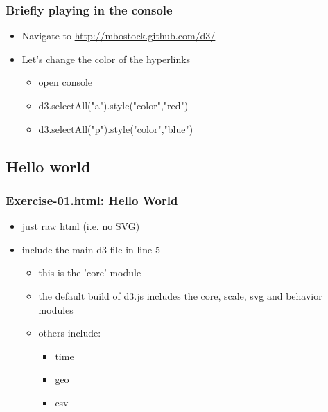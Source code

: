 \documentclass{beamer}
\begin{document}
\begin{frame}
    \frametitle{Briefly playing in the console}
    \begin{itemize}
    \item Navigate to \href{http://mbostock.github.com/d3/}{http://mbostock.github.com/d3/}
    \item Let's change the color of the hyperlinks
        \begin{itemize}
        \item open console
        \item d3.selectAll("a").style("color","red")
        \item d3.selectAll("p").style("color","blue")
        \end{itemize}
    \end{itemize}
\end{frame}



\subsection{Hello world}

\begin{frame}
    \frametitle{Exercise-01.html: Hello World}
    \begin{itemize}
    \item just raw html (i.e. no SVG)
    \item include the main d3 file in line 5
        \begin{itemize}
        \item this is the 'core' module
        \item the default build of d3.js includes the core, scale, svg and behavior modules
        \item others include:
            \begin{itemize}
            \item time
            \item geo
            \item csv
            \end{itemize}
        \end{itemize}
    \end{itemize}
\end{frame}
\end{document}
